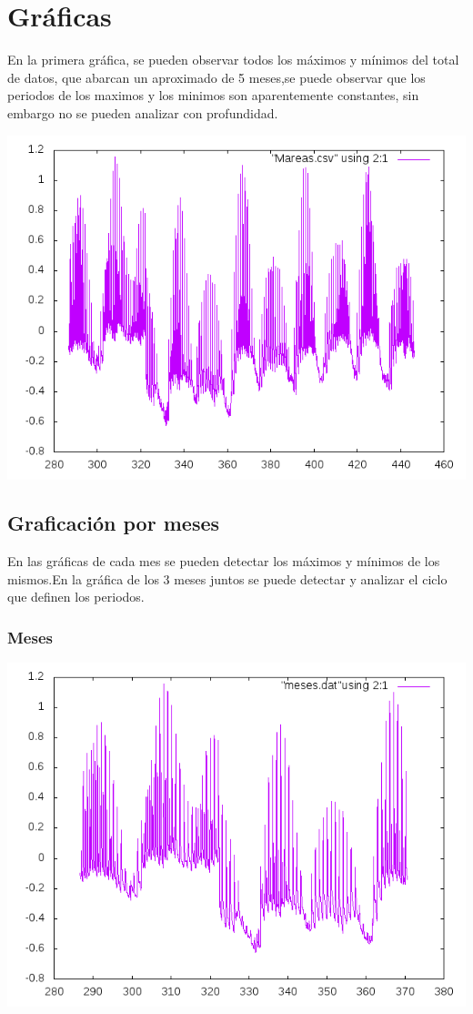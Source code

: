 \documentclass[10pt]{article}
\begin{document}
\newpage


\section{Gráficas}
En la primera gráfica, se pueden observar todos los máximos y mínimos del total de datos, que abarcan un aproximado de 5 meses,se puede observar que los periodos de los maximos y los minimos son aparentemente constantes, sin embargo no se pueden analizar con profundidad.
\begin{center}
 \includegraphics[scale=0.8]{grafica1.png}
\end{center}


\newpage
\subsection{Graficación por meses}
En las gráficas de cada mes se pueden detectar los máximos y mínimos de los mismos.En la gráfica de los 3 meses juntos se puede detectar y analizar el ciclo que definen los periodos.

\subsubsection{Meses}
\begin{center}
   \includegraphics[scale=0.8]{meses.png}
\end{center}
\end{document}
